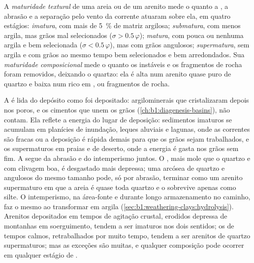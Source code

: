 \begin{definition}\label{def:b1:clastic-sediments:maturity}
A \emph{maturidade textural} de uma areia ou de um arenito mede o quanto a , a abrasão e a separação pelo vento da corrente atuaram sobre ela, em quatro estágios: \emph{imatura}, com mais de \qty{5}{\percent} de matriz argilosa; \emph{submatura}, com menos argila, mas grãos mal selecionados ($\sigma > 0.5\,\varphi$); \emph{matura}, com pouca ou nenhuma argila e bem selecionada ($\sigma < 0.5\,\varphi$), mas com grãos angulosos; \emph{supermatura}, sem argila e com grãos ao mesmo tempo bem selecionados e bem arredondados. Sua \emph{maturidade composicional} mede o quanto os  instáveis e os fragmentos de rocha foram removidos, deixando o quartzo: ela é alta num arenito quase puro de quartzo e baixa num rico em ,  ou fragmentos de rocha.
\end{definition}

A  é lida do depósito como foi depositado: argilominerais que cristalizaram depois nos poros, e os cimentos que unem os grãos (\cref{ch:b1:diagenesis-basins}), não contam. Ela reflete a energia do lugar de deposição: sedimentos imaturos se acumulam em planícies de inundação, leques aluviais e lagunas, onde as correntes são fracas ou a deposição é rápida demais para que os grãos sejam trabalhados, e os supermaturos em praias e  de deserto, onde a energia é gasta nos grãos sem fim. A  segue da abrasão e do intemperismo juntos. O , mais mole que o quartzo e com clivagem boa, é desgastado mais depressa; uma arcósea de quartzo e  angulosos do mesmo tamanho pode, só por abrasão, terminar como um arenito supermaturo em que a areia é quase toda quartzo e o  sobrevive apenas como silte. O intemperismo, na área-fonte e durante longo armazenamento no caminho, faz o mesmo ao transformar  em argila (\cref{sec:b1:weathering-clays:hydrolysis}). Arenitos depositados em tempos de agitação crustal, erodidos depressa de montanhas em soerguimento, tendem a ser imaturos nos dois sentidos; os de tempos calmos, retrabalhados por muito tempo, tendem a ser arenitos de quartzo supermaturos; mas as exceções são muitas, e qualquer composição pode ocorrer em qualquer estágio de .

